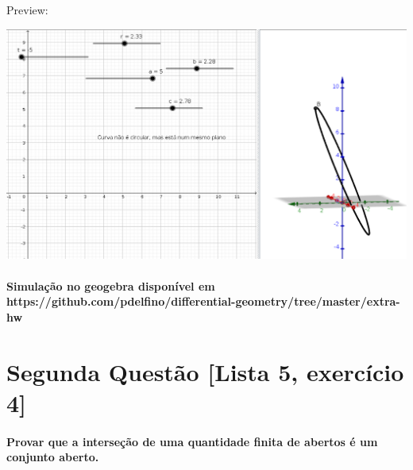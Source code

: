\documentclass[fleqn]{article}
\begin{document}
Preview:
\bigskip

\includegraphics[scale=0.2]{questao-torcao-zero}
\bigskip

\paragraph{Simulação no geogebra disponível em https://github.com/pdelfino/differential-geometry/tree/master/extra-hw}


\newpage

\section*{Segunda Questão [Lista 5, exercício 4]} 

\paragraph{Provar que a interseção de uma quantidade finita de abertos é um conjunto aberto.}
\end{document}
